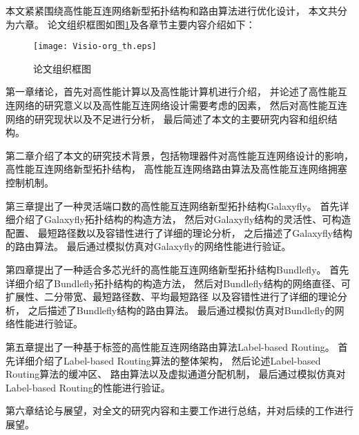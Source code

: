 本文紧紧围绕高性能互连网络新型拓扑结构和路由算法进行优化设计，
本文共分为六章。
论文组织框图如图\ref{orgth}及各章节主要内容介绍如下：


\begin{figure}[htp]
\centering
\texttt{[image: Visio-org\_th.eps]}
\caption{论文组织框图}
\label{orgth}
\end{figure}

第一章绪论，首先对高性能计算以及高性能计算机进行介绍，
并论述了高性能互连网络的研究意义以及高性能互连网络设计需要考虑的因素，
然后对高性能互连网络的研究现状以及不足进行分析，
最后简述了本文的主要研究内容和组织结构。

第二章介绍了本文的研究技术背景，包括物理器件对高性能互连网络设计的影响，
高性能互连网络新型拓扑结构，
高性能互连网络路由算法及高性能互连网络拥塞控制机制。

第三章提出了一种灵活端口数的高性能互连网络新型拓扑结构Galaxyfly。
首先详细介绍了Galaxyfly拓扑结构的构造方法，
然后对Galaxyfly结构的灵活性、可构造配置、
最短路径数以及容错性进行了详细的理论分析，
之后描述了Galaxyfly结构的路由算法。
最后通过模拟仿真对Galaxyfly的网络性能进行验证。

第四章提出了一种适合多芯光纤的高性能互连网络新型拓扑结构Bundlefly。
首先详细介绍了Bundlefly拓扑结构的构造方法，
然后对Bundlefly结构的网络直径、可扩展性、二分带宽、最短路径数、平均最短路径
以及容错性进行了详细的理论分析，
之后描述了Bundlefly结构的路由算法。
最后通过模拟仿真对Bundlefly的网络性能进行验证。

第五章提出了一种基于标签的高性能互连网络路由算法Label-based Routing。
首先详细介绍了Label-based Routing算法的整体架构，
然后论述Label-based Routing算法的缓冲区、
路由算法以及虚拟通道分配机制，
最后通过模拟仿真对Label-based Routing的性能进行验证。

第六章结论与展望，对全文的研究内容和主要工作进行总结，并对后续的工作进行展望。

